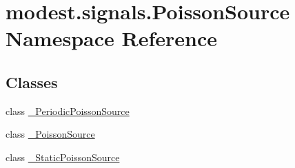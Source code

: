 \hypertarget{namespacemodest_1_1signals_1_1PoissonSource}{}\section{modest.\+signals.\+Poisson\+Source Namespace Reference}
\label{namespacemodest_1_1signals_1_1PoissonSource}
\subsection*{Classes}
\begin{DoxyCompactItemize}
\item 
class \hyperlink{classmodest_1_1signals_1_1PoissonSource_1_1__PeriodicPoissonSource}{\+\_\+\+Periodic\+Poisson\+Source}
\item 
class \hyperlink{classmodest_1_1signals_1_1PoissonSource_1_1__PoissonSource}{\+\_\+\+Poisson\+Source}
\item 
class \hyperlink{classmodest_1_1signals_1_1PoissonSource_1_1__StaticPoissonSource}{\+\_\+\+Static\+Poisson\+Source}
\end{DoxyCompactItemize}
